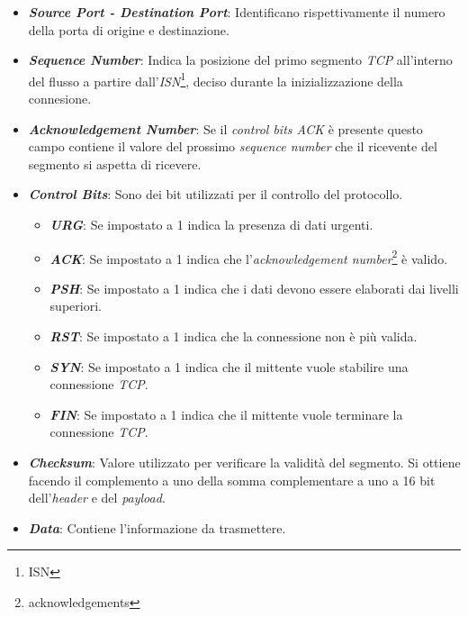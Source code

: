 \begin{itemize}
\item \textit{\textbf{Source Port - Destination Port}}: Identificano rispettivamente il numero della porta di origine e destinazione.
\item \textit{\textbf{Sequence Number}}: Indica la posizione del primo segmento \emph{TCP} all'interno del flusso a partire dall'\emph{ISN}\footnote{\gls{ISN}}, deciso durante la inizializzazione della connesione.
\item \textit{\textbf{Acknowledgement Number}}: Se il \emph{control bits ACK} è presente questo campo contiene il valore del prossimo \emph{sequence number} che il ricevente del segmento si aspetta di ricevere.
\item \textit{\textbf{Control Bits}}: Sono dei bit utilizzati per il controllo del protocollo. 
\begin{itemize}
    \item \textit{\textbf{URG}}: Se impostato a 1 indica la presenza di dati urgenti.
    \item \textit{\textbf{ACK}}: Se impostato a 1 indica che l'\emph{acknowledgement number}\footnote{\gls{acknowledgements}} è valido.
    \item \textit{\textbf{PSH}}: Se impostato a 1 indica che i dati devono essere elaborati dai livelli superiori.
    \item \textit{\textbf{RST}}: Se impostato a 1 indica che la connessione non è più valida.
    \item \textit{\textbf{SYN}}: Se impostato a 1 indica che il mittente vuole stabilire una connessione \emph{TCP}.
    \item \textit{\textbf{FIN}}: Se impostato a 1 indica che il mittente vuole terminare la connessione \emph{TCP}.
\end{itemize}
\item \textit{\textbf{Checksum}}: Valore utilizzato per verificare la validità del segmento. Si ottiene facendo il complemento a uno della somma complementare a uno a 16 bit dell'\emph{header} e del \emph{payload}.
\item \textit{\textbf{Data}}: Contiene l'informazione da trasmettere.
\end{itemize}

